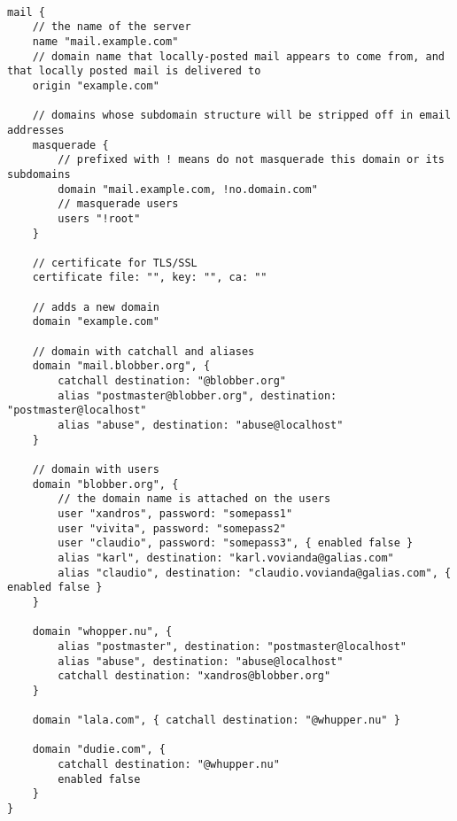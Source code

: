 \begin{lstlisting}[style=Java,label=lst:dns_example_script,caption=Dns Example Script]

mail {
    // the name of the server
    name "mail.example.com"
    // domain name that locally-posted mail appears to come from, and that locally posted mail is delivered to
    origin "example.com"

    // domains whose subdomain structure will be stripped off in email addresses
    masquerade {
        // prefixed with ! means do not masquerade this domain or its subdomains
        domain "mail.example.com, !no.domain.com"
        // masquerade users
        users "!root"
    }

    // certificate for TLS/SSL
    certificate file: "", key: "", ca: ""

    // adds a new domain
    domain "example.com"

    // domain with catchall and aliases
    domain "mail.blobber.org", {
        catchall destination: "@blobber.org"
        alias "postmaster@blobber.org", destination: "postmaster@localhost"
        alias "abuse", destination: "abuse@localhost"
    }

    // domain with users
    domain "blobber.org", {
        // the domain name is attached on the users
        user "xandros", password: "somepass1"
        user "vivita", password: "somepass2"
        user "claudio", password: "somepass3", { enabled false }
        alias "karl", destination: "karl.vovianda@galias.com"
        alias "claudio", destination: "claudio.vovianda@galias.com", { enabled false }
    }

    domain "whopper.nu", {
        alias "postmaster", destination: "postmaster@localhost"
        alias "abuse", destination: "abuse@localhost"
        catchall destination: "xandros@blobber.org"
    }

    domain "lala.com", { catchall destination: "@whupper.nu" }

    domain "dudie.com", {
        catchall destination: "@whupper.nu"
        enabled false
    }
}
\end{lstlisting}
